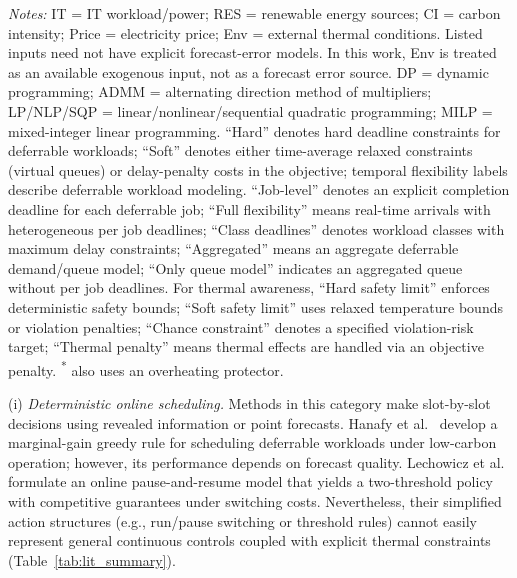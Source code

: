 \documentclass[a4paper,fleqn]{cas-dc}
\theoremstyle{plain}
\theoremstyle{remark}
\theoremstyle{plain}
\begin{document}
\begin{table}[t]
\vspace{0.15em}
\begin{minipage}{\textwidth}
\fontsize{8}{9}\selectfont
\raggedright
\textit{Notes:}
IT = IT workload/power; RES = renewable energy sources; CI = carbon intensity; Price = electricity price; Env = external thermal conditions. Listed inputs need not have explicit forecast-error models. In this work, Env is treated as an available exogenous input, not as a forecast error source.
DP = dynamic programming; ADMM = alternating direction method of multipliers; LP/NLP/SQP = linear/nonlinear/sequential quadratic programming; MILP = mixed-integer linear programming.
``Hard'' denotes hard deadline constraints for deferrable workloads; ``Soft'' denotes either time-average relaxed constraints (virtual queues) or delay-penalty costs in the objective; temporal flexibility labels describe deferrable workload modeling.
``Job-level'' denotes an explicit completion deadline for each deferrable job; ``Full flexibility'' means real-time arrivals with heterogeneous per job deadlines; ``Class deadlines'' denotes workload classes with maximum delay constraints; ``Aggregated'' means an aggregate deferrable demand/queue model; ``Only queue model'' indicates an aggregated queue without per job deadlines.
For thermal awareness, ``Hard safety limit'' enforces deterministic safety bounds; ``Soft safety limit'' uses relaxed temperature bounds or violation penalties; ``Chance constraint'' denotes a specified violation-risk target; ``Thermal penalty'' means thermal effects are handled via an objective penalty. \textsuperscript{*}\cite{chi2021_multi_agent_drl_efficiency} also uses an overheating protector.
\end{minipage}

\end{table}

(i) \textit{Deterministic online scheduling.}
Methods in this category make slot-by-slot decisions using revealed information or point forecasts. Hanafy et al.~\cite{hanafy2023_carbonscaler} develop a marginal-gain greedy rule for scheduling deferrable workloads under low-carbon operation; however, its performance depends on forecast quality. Lechowicz et al.~\cite{lechowicz2023_online_pause_resume} formulate an online pause-and-resume model that yields a two-threshold policy with competitive guarantees under switching costs. Nevertheless, their simplified action structures (e.g., run/pause switching or threshold rules) cannot easily represent general continuous controls coupled with explicit thermal constraints (Table~\ref{tab:lit_summary}).
\end{document}
